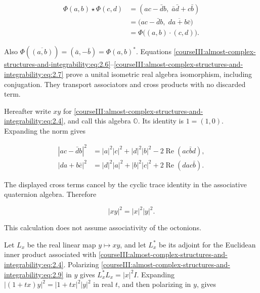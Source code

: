 \begin{equation}
\begin{aligned}
\Phi(a,b)\star\Phi(c,d)
&=(ac-\bar d b,\;\bar a\bar d+c\bar b)\\
&=\bigl(ac-\bar d b,\;\overline{da+b\bar c}\bigr)\\
&=\Phi\bigl((a,b)\cdot(c,d)\bigr).
\end{aligned}
\label{courseIII:almost-complex-structures-and-integrability:eq:2.7}
\end{equation}

Also \(\Phi(\overline{(a,b)})=(\bar a,-\bar b)=\Phi(a,b)^*\). Equations \eqref{courseIII:almost-complex-structures-and-integrability:eq:2.6}--\eqref{courseIII:almost-complex-structures-and-integrability:eq:2.7} prove a unital isometric real algebra isomorphism, including conjugation. They transport associators and cross products with no discarded term.

Hereafter write \(xy\) for \eqref{courseIII:almost-complex-structures-and-integrability:eq:2.4}, and call this algebra \(\mathbb O\). Its identity is \(1=(1,0)\). Expanding the norm gives

\begin{equation}
\begin{aligned}
|ac-\bar d b|^2
&=|a|^2|c|^2+|d|^2|b|^2-2\operatorname{Re}(ac\bar b d),\\
|da+b\bar c|^2
&=|d|^2|a|^2+|b|^2|c|^2+2\operatorname{Re}(dac\bar b).
\end{aligned}
\label{courseIII:almost-complex-structures-and-integrability:eq:2.8}
\end{equation}

The displayed cross terms cancel by the cyclic trace identity in the associative quaternion algebra. Therefore

\begin{equation}
|xy|^2=|x|^2|y|^2.
\label{courseIII:almost-complex-structures-and-integrability:eq:2.9}
\end{equation}

This calculation does not assume associativity of the octonions.

Let \(L_x\) be the real linear map \(y\mapsto xy\), and let \(L_x^*\) be its adjoint for the Euclidean inner product associated with \eqref{courseIII:almost-complex-structures-and-integrability:eq:2.4}. Polarizing \eqref{courseIII:almost-complex-structures-and-integrability:eq:2.9} in \(y\) gives \(L_x^*L_x=|x|^2I\). Expanding \(|(1+tx)y|^2=|1+tx|^2|y|^2\) in real \(t\), and then polarizing in \(y\), gives

